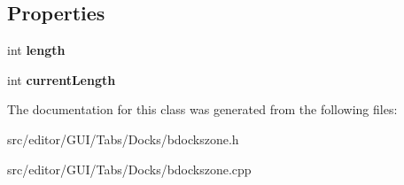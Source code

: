 \subsection*{Properties}
\begin{DoxyCompactItemize}
\item 
\hypertarget{class_b_docks_zone_a26430cbbe5912630ebeb2ff92163e659}{}\label{class_b_docks_zone_a26430cbbe5912630ebeb2ff92163e659} 
int {\bfseries length}
\item 
\hypertarget{class_b_docks_zone_a3ba97d259ca964bebff21ff657038e29}{}\label{class_b_docks_zone_a3ba97d259ca964bebff21ff657038e29} 
int {\bfseries current\+Length}
\end{DoxyCompactItemize}


The documentation for this class was generated from the following files\+:\begin{DoxyCompactItemize}
\item 
src/editor/\+G\+U\+I/\+Tabs/\+Docks/bdockszone.\+h\item 
src/editor/\+G\+U\+I/\+Tabs/\+Docks/bdockszone.\+cpp\end{DoxyCompactItemize}
